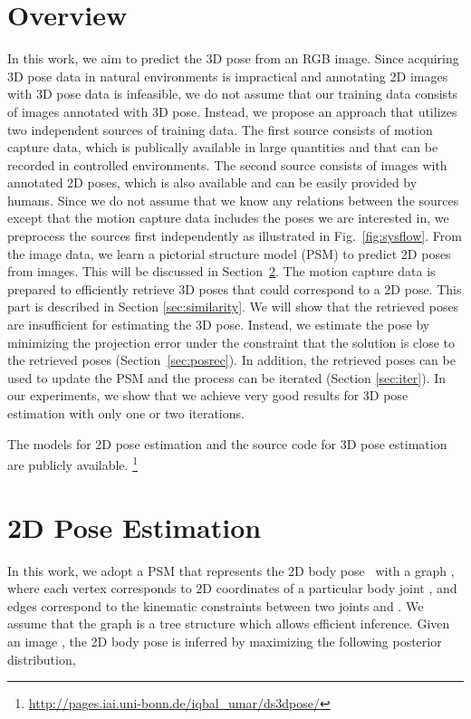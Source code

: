 \documentclass[10pt,twocolumn,letterpaper]{article}
\newcommand{\pd}{\mbox{}}       \newcommand{\pdmat}{\mbox{}}
\begin{document}
\section{Overview}\label{sec:overview}
In this work, we aim to predict the 3D pose from an RGB image. Since acquiring 3D pose data in natural environments is impractical and annotating 2D images with 3D pose data is infeasible, we do not assume that our training data consists of images annotated with 3D pose. Instead, we propose an approach that utilizes two independent sources of training data. The first source consists of motion capture data, which is publically available in large quantities and that can be recorded in controlled environments. The second source consists of images with annotated 2D poses, which is also available and can be easily provided by humans. Since we do not assume that we know any relations between the sources except that the motion capture data includes the poses we are interested in, we preprocess the sources first independently as illustrated in Fig.~\ref{fig:sysflow}. From the image data, we learn a pictorial structure model (PSM) to predict 2D poses from images. This will be discussed in Section~\ref{sec:posdet}. The motion capture data is prepared to efficiently retrieve 3D poses that could correspond to a 2D pose. This part is described in Section \ref{sec:similarity}. We will show that the retrieved poses are insufficient for estimating the 3D pose. Instead, we estimate the pose by minimizing the projection error under the constraint that the solution is close to the retrieved poses (Section~\ref{sec:posrec}).
In addition, the retrieved poses can be used to update the PSM and the process can be iterated (Section \ref{sec:iter}). In our experiments, we show that we achieve very good results for 3D pose estimation with only one or two iterations.

The models for 2D pose estimation and the source code for 3D pose estimation are publicly available. \footnote{\url{http://pages.iai.uni-bonn.de/iqbal_umar/ds3dpose/}}


\section{2D Pose Estimation}\label{sec:posdet}
In this work, we adopt a PSM that represents the 2D body pose \pd~with a graph , where each vertex corresponds to 2D coordinates of a particular body joint , and edges correspond to the kinematic constraints between two joints  and . We assume that the graph is a tree structure which allows efficient inference. Given an image , the 2D body pose is inferred by maximizing the following posterior distribution,
\end{document}
